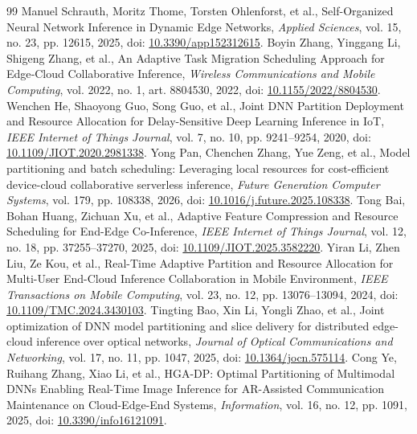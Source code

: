 \documentclass[10pt,a4paper,twocolumn]{article}
\begin{document}
\begin{thebibliography}{99}
 Manuel Schrauth, Moritz Thome, Torsten Ohlenforst, et al., Self-Organized Neural Network Inference in Dynamic Edge Networks, \emph{Applied Sciences}, vol. 15, no. 23, pp. 12615, 2025, doi: \href{https://doi.org/10.3390/app152312615}{10.3390/app152312615}.
 Boyin Zhang, Yinggang Li, Shigeng Zhang, et al., An Adaptive Task Migration Scheduling Approach for Edge‐Cloud Collaborative Inference, \emph{Wireless Communications and Mobile Computing}, vol. 2022, no. 1, art. 8804530, 2022, doi: \href{https://doi.org/10.1155/2022/8804530}{10.1155/2022/8804530}.
 Wenchen He, Shaoyong Guo, Song Guo, et al., Joint DNN Partition Deployment and Resource Allocation for Delay-Sensitive Deep Learning Inference in IoT, \emph{IEEE Internet of Things Journal}, vol. 7, no. 10, pp. 9241--9254, 2020, doi: \href{https://doi.org/10.1109/JIOT.2020.2981338}{10.1109/JIOT.2020.2981338}.
 Yong Pan, Chenchen Zhang, Yue Zeng, et al., Model partitioning and batch scheduling: Leveraging local resources for cost-efficient device-cloud collaborative serverless inference, \emph{Future Generation Computer Systems}, vol. 179, pp. 108338, 2026, doi: \href{https://doi.org/10.1016/j.future.2025.108338}{10.1016/j.future.2025.108338}.
 Tong Bai, Bohan Huang, Zichuan Xu, et al., Adaptive Feature Compression and Resource Scheduling for End-Edge Co-Inference, \emph{IEEE Internet of Things Journal}, vol. 12, no. 18, pp. 37255--37270, 2025, doi: \href{https://doi.org/10.1109/JIOT.2025.3582220}{10.1109/JIOT.2025.3582220}.
 Yiran Li, Zhen Liu, Ze Kou, et al., Real-Time Adaptive Partition and Resource Allocation for Multi-User End-Cloud Inference Collaboration in Mobile Environment, \emph{IEEE Transactions on Mobile Computing}, vol. 23, no. 12, pp. 13076--13094, 2024, doi: \href{https://doi.org/10.1109/TMC.2024.3430103}{10.1109/TMC.2024.3430103}.
 Tingting Bao, Xin Li, Yongli Zhao, et al., Joint optimization of DNN model partitioning and slice delivery for distributed edge-cloud inference over optical networks, \emph{Journal of Optical Communications and Networking}, vol. 17, no. 11, pp. 1047, 2025, doi: \href{https://doi.org/10.1364/jocn.575114}{10.1364/jocn.575114}.
 Cong Ye, Ruihang Zhang, Xiao Li, et al., HGA-DP: Optimal Partitioning of Multimodal DNNs Enabling Real-Time Image Inference for AR-Assisted Communication Maintenance on Cloud-Edge-End Systems, \emph{Information}, vol. 16, no. 12, pp. 1091, 2025, doi: \href{https://doi.org/10.3390/info16121091}{10.3390/info16121091}.

\end{thebibliography}
\end{document}
